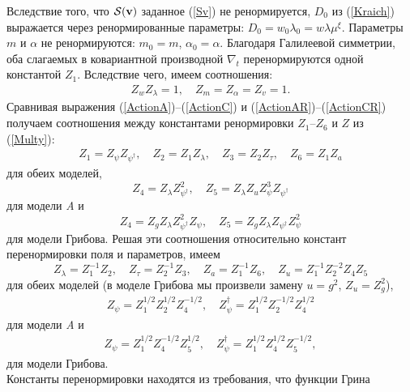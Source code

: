 \documentclass[a4paper,10pt]{article}
\def\S{{\cal S}}
\def\bfv{{\bf v}}
\def\S{{\cal S}}
\def\bfv{{\bf v}}
\begin{document}
Вследствие того, что $\S(\bfv)$ заданное (\ref{Sv}) не ренормируется, $D_{0}$ из (\ref{Kraich}) выражается через ренормированные параметры: $D_{0} = w_{0} \lambda_{0}  = w\lambda \mu^{\xi}$.
Параметры $m$ и $\alpha$ не ренормируются: $m_{0} = m$,
$\alpha_{0} = \alpha$.
Благодаря Галилеевой симметрии, оба слагаемых в ковариантной производной $\nabla_{t}$  перенормируются одной константой $Z_{1}$. 
Вследствие чего, имеем соотношения:
\begin{eqnarray}
Z_{w}Z_{\lambda} =1, \quad Z_{m}= Z_{\alpha} = Z_{v} =1.
\label{RenD}
\end{eqnarray}
Сравнивая выражения (\ref{ActionA})--(\ref{ActionC}) и
(\ref{ActionAR})--(\ref{ActionCR}) получаем соотношения между константами ренормировки $Z_{1}$--$Z_{6}$ и $Z$ из (\ref{Multy}):
\begin{eqnarray}
Z_{1} = Z_{\psi} Z_{\psi^{\dagger}}, \quad Z_{2} = Z_{1}Z_{\lambda}, \quad
Z_{3} = Z_{2} Z_{\tau}, \quad Z_{6} = Z_{1} Z_{a}
\label{ZZ}
\end{eqnarray}
для обеих моделей,
\begin{equation}
Z_{4} = Z_{\lambda} Z_{\psi^{\dagger}}^{2}, \quad
Z_{5} = Z_{\lambda}Z_{u} Z_{\psi}^{3} Z_{\psi^{\dagger}}
\label{ZA}
\end{equation}
для модели {\it A} и
\begin{equation}
Z_{4} = Z_{g} Z_{\lambda} Z_{\psi^{\dagger}}^{2} Z_{\psi},
\quad Z_{5} = Z_{g} Z_{\lambda} Z_{\psi^{\dagger}} Z_{\psi}^{2}
\label{ZG}
\end{equation}
для модели Грибова.
Решая эти соотношения относительно констант перенормировки поля и параметров, имеем
\begin{equation}
Z_{\lambda} = Z_{1}^{-1} Z_{2}, \quad Z_{\tau} = Z_{2}^{-1} Z_{3}, \quad
Z_{a} = Z_{1}^{-1} Z_{6}, \quad
Z_{u} = Z_{1}^{-1} Z_{2}^{-2} Z_{4} Z_{5}
\label{ResoC}
\end{equation}
для обеих моделей (в моделе Грибова мы произвели замену $u=g^{2}$, $Z_{u}=Z_{g}^{2}$),
\begin{eqnarray}
Z_{\psi}= Z_{1}^{1/2}Z_{2}^{1/2}Z_{4}^{-1/2}, \quad
Z_{\psi}^{\dag}= Z_{1}^{1/2}Z_{2}^{-1/2}Z_{4}^{1/2}
\label{ResoA}
\end{eqnarray}
для модели {\it A} и
\begin{eqnarray}
Z_{\psi}= Z_{1}^{1/2}Z_{4}^{-1/2}Z_{5}^{1/2}, \quad
Z_{\psi}^{\dag}= Z_{1}^{1/2}Z_{4}^{1/2}Z_{5}^{-1/2},
\label{ResoG}
\end{eqnarray}
для модели Грибова.\\
Константы перенормировки находятся из требования, что функции Грина 
\end{document}
